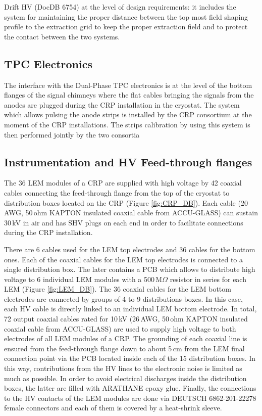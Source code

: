 Drift HV (DocDB 6754) at the level of design requirements: it includes the system for maintaining the proper distance between the top most field shaping profile to the extraction grid to keep the proper extraction field and to protect the contact between the two systems.\\

\subsection{TPC Electronics}
\label{sec:fddp-crp-intfc-elec}

The interface with the Dual-Phase TPC electronics is at the level of the bottom flanges of the signal chimneys where the flat cables bringing the signals from the anodes are plugged during the CRP installation in the cryostat. The system which allows pulsing the anode strips is installed by the CRP consortium at the moment of the CRP installations. The strips calibration by using this system is then performed jointly by the two consortia

\subsection{Instrumentation and HV Feed-through flanges}
\label{sec:fddp-crp-intfc-FT}
The 36 LEM modules of a CRP are supplied with high voltage by 42 coaxial cables 
connecting the feed-through flange from the top of the cryostat to distribution boxes located on the CRP (Figure \ref{fig:CRP_DB}). Each cable (20\,AWG, 50\,ohm KAPTON insulated coaxial cable from ACCU-GLASS) can sustain 30\,kV in air and has SHV plugs on each end in order to facilitate connections during the CRP installation.

There are 6 cables used for the LEM top electrodes and 36 cables for the bottom ones. Each of the coaxial cables for the LEM top electrodes is connected to a single distribution box. The later contains a PCB which allows to distribute high voltage to 6 individual LEM modules with a 500\,M$\Omega$ resistor in series for each 
LEM (Figure \ref{fig:LEM_DB}). The 36 coaxial cables for the LEM bottom electrodes are connected by groups of 4 to 9 distributions boxes. In this case, each HV cable is directly linked to an individual LEM bottom electrode. In total, 72 output coaxial cables rated for 10\,kV (26\,AWG, 50\,ohm KAPTON insulated coaxial cable from ACCU-GLASS) are used to supply high voltage to both electrodes of all LEM modules of a CRP. The grounding of each coaxial line is ensured from the feed-through flange down to about 5\,cm from the LEM final connection point via the PCB located inside each of the 15 distribution boxes. In this way, contributions from the HV lines to the electronic noise is limited as much as possible. In order to avoid electrical discharges inside the distribution boxes, the latter are filled with ARATHANE epoxy glue. Finally, the connections to the HV contacts of the LEM modules are done via  DEUTSCH 6862-201-22278 female connectors and each of them is covered by a heat-shrink sleeve. 

